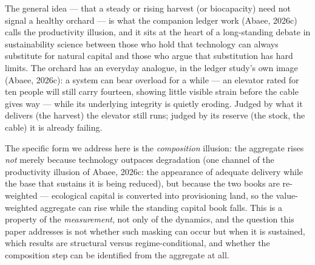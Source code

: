 \documentclass[11pt]{article}
\begin{document}
The general idea --- that a steady or rising harvest (or biocapacity) need not signal a healthy orchard --- is what the companion ledger work (Abaee, 2026c) calls the productivity illusion, and it sits at the heart of a long-standing debate in sustainability science between those who hold that technology can always substitute for natural capital and those who argue that substitution has hard limits. The orchard has an everyday analogue, in the ledger study's own image (Abaee, 2026c): a system can bear overload for a while --- an elevator rated for ten people will still carry fourteen, showing little visible strain before the cable gives way --- while its underlying integrity is quietly eroding. Judged by what it delivers (the harvest) the elevator still runs; judged by its reserve (the stock, the cable) it is already failing.

The specific form we address here is the \emph{composition} illusion: the aggregate rises \emph{not} merely because technology outpaces degradation (one channel of the productivity illusion of Abaee, 2026c: the appearance of adequate delivery while the base that sustains it is being reduced), but because the two books are re-weighted --- ecological capital is converted into provisioning land, so the value-weighted aggregate can rise while the standing capital book falls. This is a property of the \emph{measurement}, not only of the dynamics, and the question this paper addresses is not whether such masking can occur but when it is sustained, which results are structural versus regime-conditional, and whether the composition step can be identified from the aggregate at all.
\end{document}
